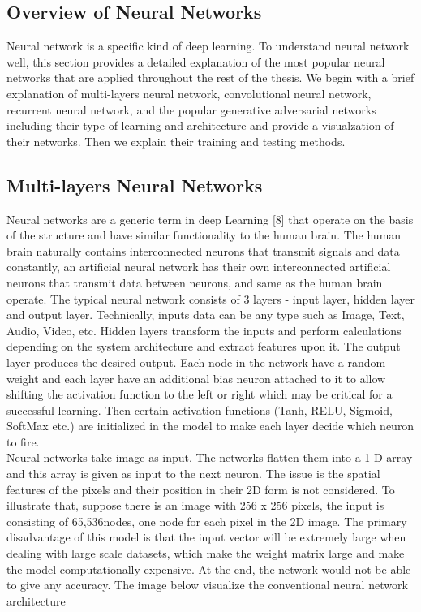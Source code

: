 \subsection{Overview of Neural Networks}
\hspace{5mm} Neural network is a specific kind of deep learning. To understand neural network well, this section provides a detailed explanation of the most popular neural networks that are applied throughout the rest of the thesis. We begin with a brief explanation of multi-layers neural network, convolutional neural network, recurrent neural network, and the popular generative adversarial networks including their type of learning and architecture and provide a visualzation of their networks. Then we explain their training and testing methods.
\subsection{Multi-layers Neural Networks}
\hspace{5mm} Neural networks are a generic term in deep Learning [8] that operate on the basis of the structure and have similar functionality to the human brain. The human brain naturally contains interconnected neurons that transmit signals and data constantly, an artificial neural network has their own interconnected artificial neurons that transmit data between neurons, and same as the human brain operate. The typical neural network consists of 3 layers - input layer, hidden layer and output layer. Technically, inputs data can be any type such as Image, Text, Audio, Video, etc. Hidden layers transform the inputs and perform calculations depending on the system architecture and extract features upon it. The output layer produces the desired output. Each node in the network have a random weight and each layer have an additional bias neuron attached to it to allow shifting the activation function to the left or right which may be critical for a successful learning. Then certain activation functions (Tanh, RELU, Sigmoid, SoftMax etc.) are initialized in the model to make each layer decide which neuron to fire.\\
Neural networks take image as input. The networks flatten them into a 1-D array and this array is given as input to the next neuron. The issue is the spatial features of the pixels and their position in their 2D form is not considered. To illustrate that, suppose there is an image with 256 x 256 pixels, the input is consisting of 65,536nodes, one node for each pixel in the 2D image. The primary disadvantage of this model is that the input vector will be extremely large when dealing with large scale datasets, which make the weight matrix large and make the model computationally expensive. At the end, the network would not be able to give any accuracy. The image below visualize the conventional neural network architecture 
